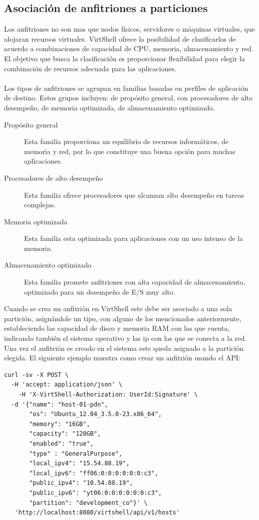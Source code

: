 \subsection{Asociación de anfitriones a particiones}
Los anfitriones no son mas que nodos físicos, servidores o máquinas virtuales, que alojaran recursos virtuales. VirtShell ofrece la posibilidad de clasificarlos de acuerdo a combinaciones de capacidad de CPU, memoria, almacenamiento y red. El objetivo que busca la clasificación es proporcionar flexibilidad para elegir la combinación de recursos adecuada para las aplicaciones.\\
\\
Los tipos de anfitriones se agrupan en familias basadas en perfiles de aplicación de destino. Estos grupos incluyen: de propósito general, con procesadores de alto desempeño, de memoria optimizada, de almacenamiento optimizado.

\begin{description}
\item [Propósito general] Esta familia proporciona un equilibrio de recursos informáticos, de memoria y red, por lo que constituye una buena opción para muchas aplicaciones.
\item [Procesadores de alto desempeño] Esta familia ofrece procesadores que alcanzan alto desempeño en tareas complejas.
\item [Memoria optimizada] Esta familia esta optimizada para aplicaciones con un uso intenso de la memoria.
\item [Almacenamiento optimizado] Esta familia promete anfitriones con alta capacidad de almacenamiento, optimizado para un desempeño de E/S muy alto.
\end{description}

Cuando se crea un anfitrión en VirtShell este debe ser asociado a una sola partición, asignándole un tipo, con alguno de los mencionados anteriormente, estableciendo las capacidad de disco y memoria RAM con las que cuenta,  
indicando también el sistema operativo y las ip con las que se conecta a la red. Una vez el anfitrión es creado en el sistema este queda asignado a la partición elegida. El siguiente ejemplo muestra como crear un anfitrión usando el API:

\begin{lstlisting}[style=json, caption=Petición HTTP para crear un host]
curl -sv -X POST \
  -H 'accept: application/json' \
    -H 'X-VirtShell-Authorization: UserId:Signature' \
  -d '{"name": "host-01-pdn",
       "os": "Ubuntu_12.04_3.5.0-23.x86_64",
       "memory": "16GB",
       "capacity": "120GB",
       "enabled": "true",
       "type" : "GeneralPurpose",
       "local_ipv4": "15.54.88.19",
       "local_ipv6": "ff06:0:0:0:0:0:0:c3",
       "public_ipv4": "10.54.88.19",
       "public_ipv6": "yt06:0:0:0:0:0:0:c3",
       "partition": "development_co"}' \
   'http://localhost:8080/virtshell/api/v1/hosts'
\end{lstlisting}

